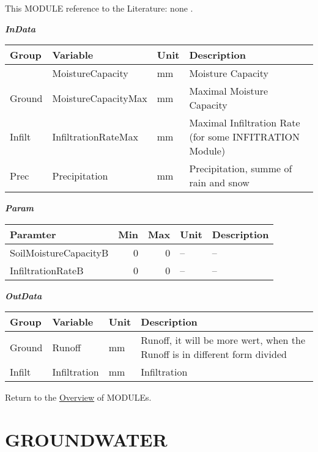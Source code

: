 \documentclass[
]{book}
\begin{document}
This MODULE reference to the Literature: none \citep{none}.

\textbf{\emph{InData}}

\begin{table}[!h]
\centering
\begin{tabular}{l|l|l|l}
\hline
Group & Variable & Unit & Description\\
\hline
 & MoistureCapacity & mm & Moisture Capacity\\
\cline{2-4}
\multirow{-2}{*}{\raggedright\arraybackslash Ground} & MoistureCapacityMax & mm & Maximal Moisture Capacity\\
\cline{1-4}
Infilt & InfiltrationRateMax & mm & Maximal Infiltration Rate (for some INFITRATION Module)\\
\cline{1-4}
Prec & Precipitation & mm & Precipitation, summe of rain and snow\\
\hline
\end{tabular}
\end{table}

\textbf{\emph{Param}}

\begin{table}[!h]
\centering
\begin{tabular}{l|r|r|l|l}
\hline
Paramter & Min & Max & Unit & Description\\
\hline
SoilMoistureCapacityB & 0 & 0 & -- & --\\
\cline{1-5}
InfiltrationRateB & 0 & 0 & -- & --\\
\hline
\end{tabular}
\end{table}

\textbf{\emph{OutData}}

\begin{table}[!h]
\centering
\begin{tabular}{l|l|l|l}
\hline
Group & Variable & Unit & Description\\
\hline
Ground & Runoff & mm & Runoff, it will be more wert, when the Runoff is in different form divided\\
\cline{1-4}
Infilt & Infiltration & mm & Infiltration\\
\hline
\end{tabular}
\end{table}

Return to the \protect\hyperlink{module}{Overview} of MODULEs.

\hypertarget{GROUNDWATER}{%
\section{GROUNDWATER}\label{GROUNDWATER}}
\end{document}
